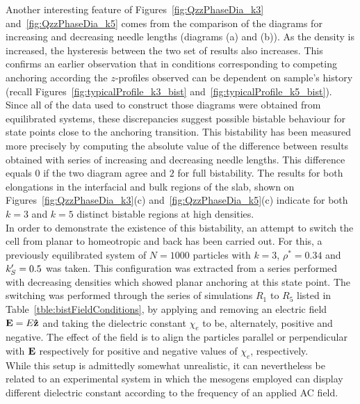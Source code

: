 Another interesting feature of Figures~\ref{fig:QzzPhaseDia_k3} and~\ref{fig:QzzPhaseDia_k5}
comes from the comparison of the diagrams for increasing and decreasing
needle lengths (\ie diagrams (a) and (b)). As the density is increased, the hysteresis between 
the two set of results also 
increases. This confirms an earlier observation that in conditions corresponding to 
competing  anchoring according the $z$-profiles observed can be dependent on 
sample's history (recall 
Figures~\ref{fig:typicalProfile_k3_bist} and~\ref{fig:typicalProfile_k5_bist}).\\
%
Since all of the data used to construct those diagrams were obtained from equilibrated systems,
these discrepancies suggest possible bistable behaviour for state points close to the
anchoring transition. This bistability has been measured more precisely by computing the
absolute value of the difference between results obtained with series of increasing and
decreasing needle lengths. This difference equals $0$ if the two diagram agree and $2$ for full
bistability. The results for both elongations in the interfacial and bulk regions of the slab,
shown on Figures~\ref{fig:QzzPhaseDia_k3}(c) and~\ref{fig:QzzPhaseDia_k5}(c)
indicate for both $k=3$ and $k=5$ distinct bistable regions at high densities.\\

In order to demonstrate the existence of this bistability, an attempt to
switch the cell from planar to homeotropic and back has been carried out. For this, a previously
equilibrated system of $N=1000$ particles with $k=3$, $\rho^{*}=0.34$ and $k_S^{\prime} = 0.5$ was
taken. This configuration was extracted from a series performed with decreasing densities which 
showed planar anchoring at this state point. The switching was performed through the series of 
simulations $R_1$ to $R_5$ listed in Table~\ref{tble:bistFieldConditions}, \ie by 
applying and removing an electric field $\mathbf{E} = E\mathbf{\hat{z} }$ and
taking the dielectric constant $\chi_e$ to be, alternately, positive and negative.
The effect of the field is to align the  particles parallel or perpendicular with $\mathbf{E}$
respectively for positive and negative values of $\chi_e$, respectively.\\
While this setup is admittedly somewhat unrealistic, it can nevertheless be related to an
experimental system in which the mesogens employed can display different dielectric constant 
according to the frequency of an applied AC field.\\

